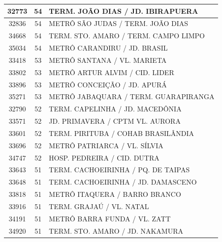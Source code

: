 \documentclass[
	12pt,				%
	oneside,			%
	a4paper,			%
	english,			%
	brazil				%
	]{abntex2ppgsi}
\begin{document}
\begin{apendicesenv}
\begin{longtable}{c|c|p{7cm}}
    32773 & 54    & TERM. JOÃO DIAS / JD. IBIRAPUERA \\
\hline

    32836 & 54    & METRÔ SÃO JUDAS / TERM. JOÃO DIAS \\
\hline

    34668 & 54    & TERM. STO. AMARO / TERM. CAMPO LIMPO \\
\hline

    35034 & 54    & METRÔ CARANDIRU / JD. BRASIL \\
\hline

    33418 & 53    & METRÔ SANTANA / VL. MARIETA \\
\hline

    33802 & 53    & METRÔ ARTUR ALVIM / CID. LIDER \\
\hline

    33896 & 53    & METRÔ CONCEIÇÃO / JD. APURÁ \\
\hline

    35271 & 53    & METRÔ JABAQUARA / TERM. GUARAPIRANGA \\
\hline

    32790 & 52    & TERM. CAPELINHA / JD. MACEDÔNIA \\
\hline

    33571 & 52    & JD. PRIMAVERA / CPTM VL. AURORA \\
\hline

    33601 & 52    & TERM. PIRITUBA / COHAB BRASILÂNDIA \\
\hline

    33696 & 52    & METRÔ PATRIARCA / VL. SÍLVIA \\
\hline

    34747 & 52    & HOSP. PEDREIRA / CID. DUTRA \\
\hline

    33643 & 51    & TERM. CACHOEIRINHA / PQ. DE TAIPAS \\
\hline

    33648 & 51    & TERM. CACHOEIRINHA / JD. DAMASCENO \\
\hline

    33818 & 51    & METRÔ ITAQUERA  / BARRO BRANCO \\
\hline

    33916 & 51    & TERM. GRAJAÚ / VL. NATAL \\
\hline

    34191 & 51    & METRÔ BARRA FUNDA / VL. ZATT \\
\hline

    34920 & 51    & TERM. STO. AMARO / JD. NAKAMURA \\
\hline


\end{longtable}
\end{apendicesenv}
\end{document}
